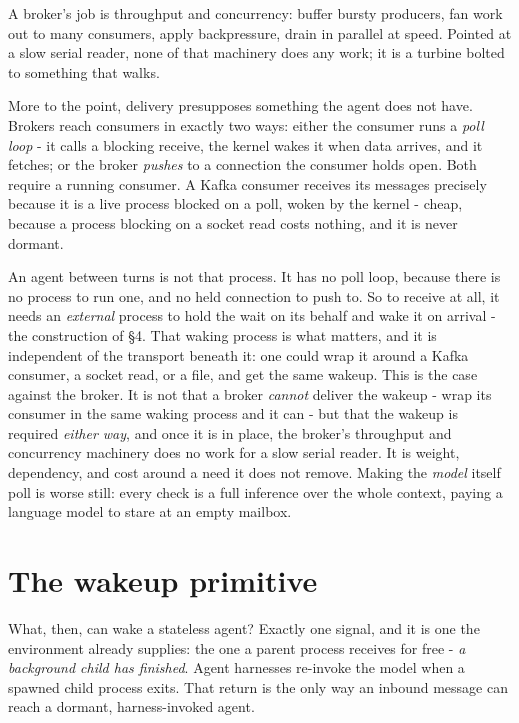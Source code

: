 \documentclass[11pt]{article}
\begin{document}
A broker's job is throughput and concurrency: buffer bursty producers, fan work out to many consumers, apply backpressure, drain in parallel at speed. Pointed at a slow serial reader, none of that machinery does any work; it is a turbine bolted to something that walks.

More to the point, delivery presupposes something the agent does not have. Brokers reach consumers in exactly two ways: either the consumer runs a \emph{poll loop} - it calls a blocking receive, the kernel wakes it when data arrives, and it fetches; or the broker \emph{pushes} to a connection the consumer holds open. Both require a running consumer. A Kafka consumer receives its messages precisely because it is a live process blocked on a poll, woken by the kernel - cheap, because a process blocking on a socket read costs nothing, and it is never dormant.

An agent between turns is not that process. It has no poll loop, because there is no process to run one, and no held connection to push to. So to receive at all, it needs an \emph{external} process to hold the wait on its behalf and wake it on arrival - the construction of \S4. That waking process is what matters, and it is independent of the transport beneath it: one could wrap it around a Kafka consumer, a socket read, or a file, and get the same wakeup. This is the case against the broker. It is not that a broker \emph{cannot} deliver the wakeup - wrap its consumer in the same waking process and it can - but that the wakeup is required \emph{either way}, and once it is in place, the broker's throughput and concurrency machinery does no work for a slow serial reader. It is weight, dependency, and cost around a need it does not remove. Making the \emph{model} itself poll is worse still: every check is a full inference over the whole context, paying a language model to stare at an empty mailbox.

\section{The wakeup primitive}

What, then, can wake a stateless agent? Exactly one signal, and it is one the environment already supplies: the one a parent process receives for free - \emph{a background child has finished}. Agent harnesses re-invoke the model when a spawned child process exits. That return is the only way an inbound message can reach a dormant, harness-invoked agent.
\end{document}
